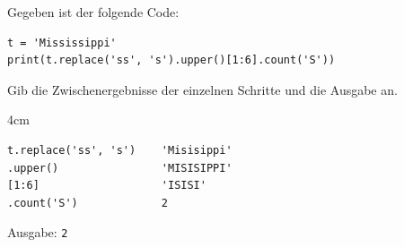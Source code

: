 \question[3]
Gegeben ist der folgende Code:
\begin{lstlisting}
t = 'Mississippi'
print(t.replace('ss', 's').upper()[1:6].count('S'))
\end{lstlisting}
Gib die Zwischenergebnisse der einzelnen Schritte und die Ausgabe an.

\begin{solutionbox}{4cm}
\begin{lstlisting}[language={}]
t.replace('ss', 's')    'Misisippi'
.upper()                'MISISIPPI'
[1:6]                   'ISISI'
.count('S')             2
\end{lstlisting}
Ausgabe: \texttt{2}
\end{solutionbox}
